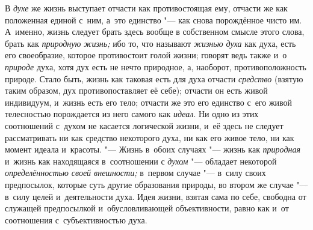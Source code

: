 В {\em духе} же жизнь выступает отчасти как противостоящая ему, отчасти же
как положенная единой с~ним, а~это единство "--- как снова
порождённое чисто им. А~именно, жизнь следует брать здесь вообще в
собственном смысле этого слова, брать как
{\em природную жизнь;} ибо то, что называют {\em жизнью духа} как
духа, есть его своеобразие, которое противостоит голой жизни; говорят ведь
также и~о {\em природе}
духа, хотя дух есть не нечто природное, а, наоборот,
противоположность природе. Стало быть, жизнь как таковая есть для духа
отчасти {\em средство}
(взятую таким образом, дух противопоставляет её себе);
отчасти он есть живой индивидуум, и~жизнь есть его тело; отчасти же это его
единство с~его живой телесностью порождается из него самого как
{\em идеал}. Ни одно из
этих соотношений с~духом не касается логической жизни, и~её здесь не
следует рассматривать ни как средство некоторого духа, ни как его живое
тело, ни как момент идеала и~красоты. "--- Жизнь в~обоих
случаях "--- жизнь как {\em природная} и~жизнь
как находящаяся в~соотношении с {\em духом} "--- обладает
некоторой {\em определённостью своей
внешности;} в~первом случае "--- в~силу своих
предпосылок, которые суть другие образования природы, во втором же случае
"--- в~силу целей и~деятельности духа. Идея жизни, взятая сама
по себе, свободна от служащей предпосылкой и~обусловливающей объективности,
равно как и~от соотношения с~субъективностью духа.

